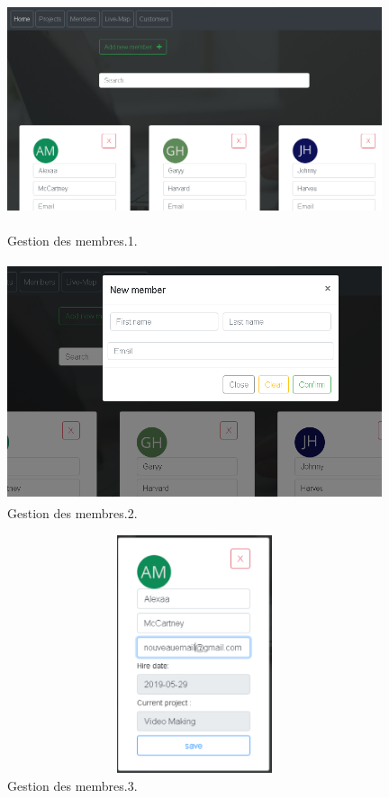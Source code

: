 \bigskip
\bigskip

\begin{figure}[H]
\center
\includegraphics[width=11cm,height=7cm]{./figures/pres/mm1.png}
\caption{Gestion des membres.1.}
\end{figure}

\begin{figure}[H]
\center
\includegraphics[width=11cm,height=7cm]{./figures/pres/mm2.png}
\caption{Gestion des membres.2.}
\end{figure}




\begin{figure}[H]
\center
\includegraphics[width=11cm,height=7cm]{./figures/pres/mm3.png}
\caption{Gestion des membres.3.}
\end{figure}


